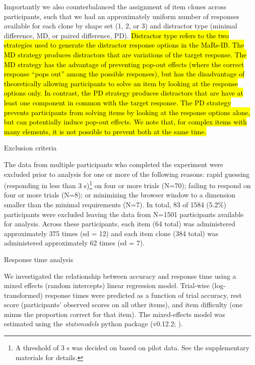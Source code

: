 \documentclass[a4paper,man,natbib,noextraspace]{apa6}
\makeatletter
\renewcommand{\subsubsection}{\@startsection{subsubsection}{3}
  {\z@}%
  {\b@level@two@skip}{\e@level@two@skip}%
  {\normalfont\normalsize\bfseries}}
\makeatother
\begin{document}
Importantly we also counterbalanced the assignment of item clones across participants, such that we had an approximately uniform number of responses available for each clone by shape set (1, 2, or 3) and distractor type (minimal difference, MD, or paired difference, PD). \hl{Distractor type refers to the two strategies used to generate the distractor response options in the MaRs-IB. The MD strategy produces distractors that are variations of the target response. The MD strategy has the advantage of preventing pop-out effects (where the correct response ``pops out'' among the possible responses), but has the disadvantage of theoretically allowing participants to solve an item by looking at the response options only. In contrast, the PD strategy produces distractors that are have at least one component in common with the target response. The PD strategy prevents participants from solving items by looking at the response options alone, but can potentially induce pop-out effects. We note that, for complex items with many elements, it is not possible to prevent both at the same time.}

\subsubsection{Exclusion criteria}

The data from multiple participants who completed the experiment were excluded prior to analysis for one or more of the following reasons: rapid guessing (responding in less than 3 s)\footnote{A threshold of 3 s was decided on based on pilot data. See the supplementary materials for details.} on four or more trials (N=70); failing to respond on four or more trials (N=8); or minimizing the browser window to a dimension smaller than the minimal requirements (N=7). In total, 83 of 1584 (5.2\%) participants were excluded leaving the data from N=1501 participants available for analysis. Across these participants, each item (64 total) was administered approximately 375 times (sd = 12) and each item clone (384 total) was administered approximately 62 times (sd = 7). 

\subsubsection{Response time analysis}

We investigated the relationship between accuracy and response time using a mixed effects (random intercepts) linear regression model. Trial-wise (log-transformed) response times were predicted as a function of trial accuracy, rest score (participants' observed scores on all other items), and item difficulty (one minus the proportion correct for that item). The mixed-effects model was estimated using the \textit{statsmodels} python package (v0.12.2;  \citealt{seabold2010statsmodels}).
\end{document}
